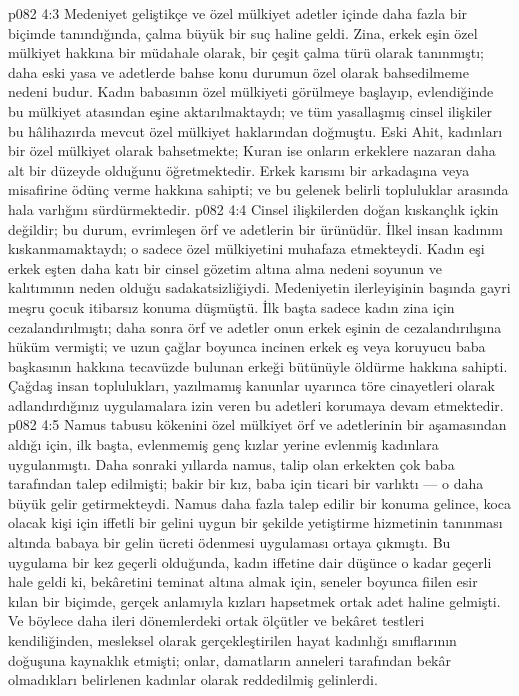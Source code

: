 \vs p082 4:3 Medeniyet geliştikçe ve özel mülkiyet adetler içinde daha fazla bir biçimde tanındığında, çalma büyük bir suç haline geldi. Zina, erkek eşin özel mülkiyet hakkına bir müdahale olarak, bir çeşit çalma türü olarak tanınmıştı; daha eski yasa ve adetlerde bahse konu durumun özel olarak bahsedilmeme nedeni budur. Kadın babasının özel mülkiyeti görülmeye başlayıp, evlendiğinde bu mülkiyet atasından eşine aktarılmaktaydı; ve tüm yasallaşmış cinsel ilişkiler bu hâlihazırda mevcut özel mülkiyet haklarından doğmuştu. Eski Ahit, kadınları bir özel mülkiyet olarak bahsetmekte; Kuran ise onların erkeklere nazaran daha alt bir düzeyde olduğunu öğretmektedir. Erkek karısını bir arkadaşına veya misafirine ödünç verme hakkına sahipti; ve bu gelenek belirli topluluklar arasında hala varlığını sürdürmektedir.
\vs p082 4:4 Cinsel ilişkilerden doğan kıskançlık içkin değildir; bu durum, evrimleşen örf ve adetlerin bir ürünüdür. İlkel insan kadınını kıskanmamaktaydı; o sadece özel mülkiyetini muhafaza etmekteydi. Kadın eşi erkek eşten daha katı bir cinsel gözetim altına alma nedeni soyunun ve kalıtımının neden olduğu sadakatsizliğiydi. Medeniyetin ilerleyişinin başında gayri meşru çocuk itibarsız konuma düşmüştü. İlk başta sadece kadın zina için cezalandırılmıştı; daha sonra örf ve adetler onun erkek eşinin de cezalandırılışına hüküm vermişti; ve uzun çağlar boyunca incinen erkek eş veya koruyucu baba başkasının hakkına tecavüzde bulunan erkeği bütünüyle öldürme hakkına sahipti. Çağdaş insan toplulukları, yazılmamış kanunlar uyarınca töre cinayetleri olarak adlandırdığınız uygulamalara izin veren bu adetleri korumaya devam etmektedir.
\vs p082 4:5 Namus tabusu kökenini özel mülkiyet örf ve adetlerinin bir aşamasından aldığı için, ilk başta, evlenmemiş genç kızlar yerine evlenmiş kadınlara uygulanmıştı. Daha sonraki yıllarda namus, talip olan erkekten çok baba tarafından talep edilmişti; bakir bir kız, baba için ticari bir varlıktı --- o daha büyük gelir getirmekteydi. Namus daha fazla talep edilir bir konuma gelince, koca olacak kişi için iffetli bir gelini uygun bir şekilde yetiştirme hizmetinin tanınması altında babaya bir gelin ücreti ödenmesi uygulaması ortaya çıkmıştı. Bu uygulama bir kez geçerli olduğunda, kadın iffetine dair düşünce o kadar geçerli hale geldi ki, bekâretini teminat altına almak için, seneler boyunca fiilen esir kılan bir biçimde, gerçek anlamıyla kızları hapsetmek ortak adet haline gelmişti. Ve böylece daha ileri dönemlerdeki ortak ölçütler ve bekâret testleri kendiliğinden, mesleksel olarak gerçekleştirilen hayat kadınlığı sınıflarının doğuşuna kaynaklık etmişti; onlar, damatların anneleri tarafından bekâr olmadıkları belirlenen kadınlar olarak reddedilmiş gelinlerdi.
